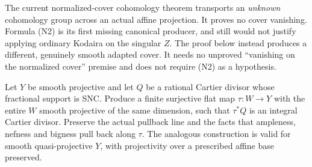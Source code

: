 The current normalized-cover cohomology theorem transports an
\emph{unknown} cohomology group across an actual affine projection.
It proves no cover vanishing.  Formula (N2) is its first missing
canonical producer, and still would not justify applying ordinary
Kodaira on the singular $Z$.  The proof below instead produces a
different, genuinely smooth adapted cover.  It needs no unproved
``vanishing on the normalized cover'' premise and does not require
(N2) as a hypothesis.

\begin{lemma}
\label{lem:kn-nadel-smooth-adapted-cover}
\notready
Let $Y$ be smooth projective and let $Q$ be a rational Cartier divisor
whose fractional support is SNC.  Produce a finite surjective flat
map $\tau:W\to Y$ with the entire $W$ smooth projective of the same
dimension, such that $\tau^*Q$ is an integral Cartier divisor.  Preserve the actual pullback
line and the facts that ampleness, nefness and bigness pull back along
$\tau$.  The analogous construction is valid for smooth
quasi-projective $Y$, with projectivity over a prescribed affine base
preserved.
\end{lemma}
